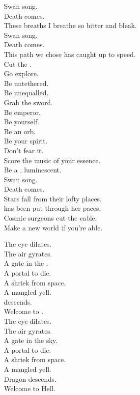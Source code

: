 Swan song. \\
Death comes. \\
These breaths I breathe so bitter and bleak. \\
Swan song. \\
Death comes. \\
This path we chose has caught up to speed. \\

Cut the . \\
Go explore. \\
Be untethered. \\
Be unequalled. \\
Grab the sword. \\
Be emperor. \\
Be yourself. \\
Be an orb. \\
Be your spirit. \\
Don't fear it. \\
Score the music of your essence. \\
Be a , luminescent. \\
Swan song. \\
Death comes. \\

Stars fall from their lofty places. \\
 has been put through her paces. \\
Cosmic surgeons cut the cable. \\
Make a new world if you're able. \\


The eye dilates. \\
The air gyrates. \\
A gate in the . \\
A portal to die. \\
A shriek from space. \\
A mangled yell. \\
 descends. \\
Welcome to . \\

The eye dilates. \\
The air gyrates. \\
A gate in the sky. \\
A portal to die. \\
A shriek from space. \\
A mangled yell. \\
Dragon descends. \\
Welcome to Hell. \\

